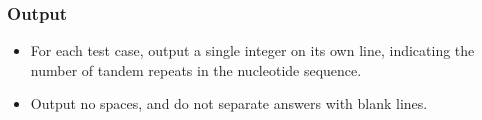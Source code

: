 \subsubsection{Output}
\begin{itemize}
	\item For each test case, output a single integer on its own line, indicating the number of tandem repeats in the nucleotide sequence.
	\item Output no spaces, and do not separate answers with blank lines.
\end{itemize}

